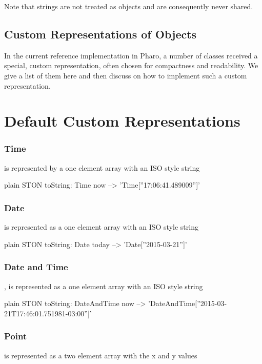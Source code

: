 \documentclass[10pt,twoside,english]{_support/latex/sbabook/sbabook}
\begin{document}
Note that strings are not treated as objects and are consequently never shared.
\section{Custom Representations of Objects}\label{customrepresentations}
In the current reference implementation in Pharo, a number of classes received a special, custom representation, often chosen for compactness and readability.
We give a list of them here and then discuss on how to implement such a custom representation.
\chapter{Default Custom Representations}\subsection{Time}
  is represented by a one element array with an ISO style  string

\begin{displaycode}{plain}
STON toString: Time now
   --> 'Time[''17:06:41.489009'']'
\end{displaycode}
\subsection{Date}
  is represented as a one element array with an ISO style  string

\begin{displaycode}{plain}
STON toString: Date today
   -->  'Date[''2015-03-21'']'
\end{displaycode}
\subsection{Date and Time}
  ,  is represented as a one element array with an ISO style  string

\begin{displaycode}{plain}
STON toString: DateAndTime now
   --> 'DateAndTime[''2015-03-21T17:46:01.751981-03:00'']'
\end{displaycode}
\subsection{Point}
  is represented as a two element array with the x and y values
\end{document}
